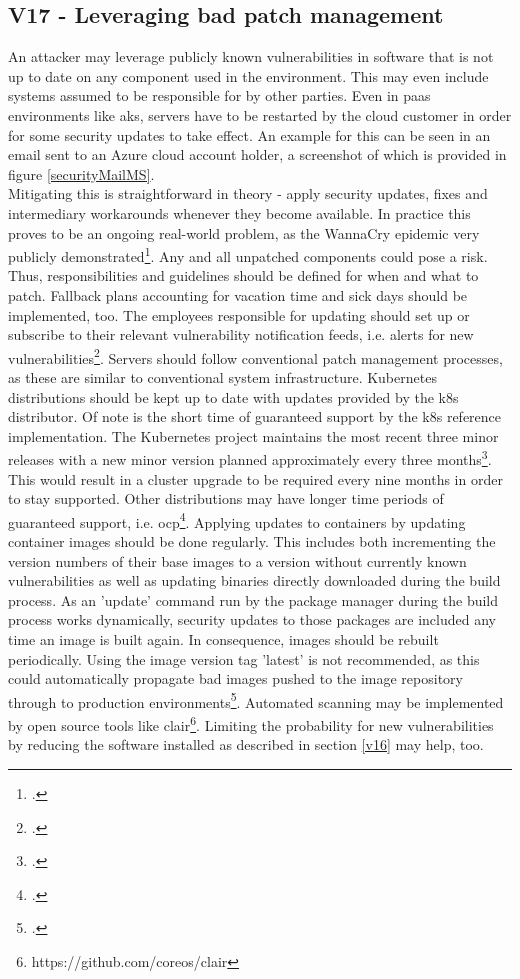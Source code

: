 \subsection{V17 - Leveraging bad patch management} \label{v17}
An attacker may leverage publicly known vulnerabilities in software that is not up to date on any component used in the environment.
This may even include systems assumed to be responsible for by other parties. Even in \gls{paas} environments like \gls{aks}, servers have to be restarted by the cloud customer in order for some security updates to take effect. An example for this can be seen in an email sent to an Azure cloud account holder, a screenshot of which is provided in figure \ref{securityMailMS}. \\
Mitigating this is straightforward in theory - apply security updates, fixes and intermediary workarounds whenever they become available.
In practice this proves to be an ongoing real-world problem, as the WannaCry epidemic very publicly demonstrated\footcite[][, p. 2]{wannaCryPatching}.
Any and all unpatched components could pose a risk. Thus, responsibilities and guidelines should be defined for when and what to patch. Fallback plans accounting for vacation time and sick days should be implemented, too. The employees responsible for updating should set up or subscribe to their relevant vulnerability notification feeds, i.e. alerts for new vulnerabilities\footcite[][, first paragraph]{azureAlerts}.
Servers should follow conventional patch management processes, as these are similar to conventional system infrastructure. Kubernetes distributions should be kept up to date with updates provided by the \gls{k8s} distributor. Of note is the short time of guaranteed support by the \gls{k8s} reference implementation. The Kubernetes project maintains the most recent three minor releases with a new minor version planned approximately every three months\footcite[][, section 'Supported versions']{k8sSupport}. This would result in a cluster upgrade to be required every nine months in order to stay supported. Other distributions may have longer time periods of guaranteed support, i.e. \gls{ocp}\footcite[][, section 'OpenShift Container Platform v3']{ocpSupport}.
Applying updates to containers by updating container images should be done regularly. This includes both incrementing the version numbers of their base images to a version without currently known vulnerabilities as well as updating binaries directly downloaded during the build process. As an 'update' command run by the package manager during the build process works dynamically, security updates to those packages are included any time an image is built again. In consequence, images should be rebuilt periodically.
Using the image version tag 'latest' is not recommended, as this could automatically propagate bad images pushed to the image repository through to production environments\footcite[][, p. 40]{k8sBook}. Automated scanning may be implemented by open source tools like clair\footnote{https://github.com/coreos/clair}. Limiting the probability for new vulnerabilities by reducing the software installed as described in section \ref{v16} may help, too.

